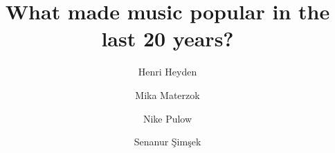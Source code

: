 

\usepackage[orientation=portrait,size=a0,scale=1.4]{beamerposter}
\usepackage{qrcode}
\usepackage{multicol}


\usepackage[pscoord]{eso-pic}%

\newcommand{\placetextbox}[3]{%
  \setbox0=\hbox{#3}%
  \AddToShipoutPictureFG*{%
    \put(\LenToUnit{#1\paperwidth},\LenToUnit{#2\paperheight}){\vtop{{\null}\makebox[0pt][c]{#3}}}%
  }%
}%

\author[H. Heyden \and M. Materzok \and N. Pulow \and S. Şimşek]{Henri Heyden \and Mika Materzok \and Nike Pulow \and Senanur Şimşek}
\title{What made music popular in the last 20 years?}



